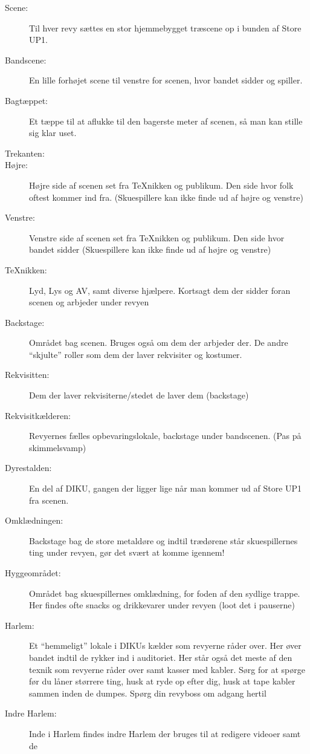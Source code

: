 \documentclass[10pt,a4paper,danish]{article}
\begin{document}
\begin{description}
\item[Scene:] Til hver revy sættes en stor hjemmebygget træscene op i bunden af
  Store UP1.
\item[Bandscene:] En lille forhøjet scene til venstre for scenen, hvor bandet
  sidder og spiller.
\item[Bagtæppet:] Et tæppe til at aflukke til den bagerste meter af scenen, så
  man kan stille sig klar uset.
\item[Trekanten:]
\item[Højre:] Højre side af scenen set fra TeXnikken og publikum.
  Den side hvor folk oftest kommer ind fra.
  (Skuespillere kan ikke finde ud af højre og venstre)
\item[Venstre:] Venstre  side af scenen set fra TeXnikken og publikum.
  Den side hvor bandet sidder
  (Skuespillere kan ikke finde ud af højre og venstre)
\item[TeXnikken:] Lyd, Lys og AV, samt diverse hjælpere.
  Kortsagt dem der sidder foran scenen og arbjeder under revyen
\item[Backstage:] Området bag scenen. Bruges også om dem der arbjeder der. De
  andre ``skjulte'' roller som dem der laver rekvisiter og kostumer.
\item[Rekvisitten:] Dem der laver rekvisiterne/stedet de laver dem (backstage)
\item[Rekvisitkælderen:] Revyernes fælles opbevaringslokale, backstage under bandscenen.
  (Pas på skimmelsvamp)
\item[Dyrestalden:] En del af DIKU, gangen der ligger lige når man kommer ud af Store UP1 fra
  scenen.
\item[Omklædningen:] Backstage bag de store metaldøre og indtil trædørene står skuespillernes ting
  under revyen, gør det svært at komme igennem!
\item[Hyggeområdet:] Området bag skuespillernes omklædning, for foden af den sydlige trappe.
  Her findes ofte snacks og drikkevarer under revyen (loot det i pauserne)
\item[Harlem:] Et ``hemmeligt'' lokale i DIKUs kælder som revyerne råder over. Her øver
  bandet indtil de rykker ind i auditoriet. Her står også det meste af den
  texnik som revyerne råder over samt kasser med kabler.
  Sørg for at spørge før du låner størrere ting, husk at ryde op efter dig, husk
  at tape kabler sammen inden de dumpes. Spørg din revyboss om adgang hertil
\item[Indre Harlem:] Inde i Harlem findes indre Harlem der bruges til at redigere videoer samt de

\end{description}
\end{document}
